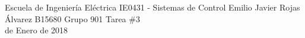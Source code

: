 \documentclass{ucrEieTarea}
\begin{document}
    {Escuela de Ingeniería Eléctrica}
    {IE0431 - Sistemas de Control}
    {Emilio Javier Rojas Álvarez}
    {B15680}
    {Grupo 901}
    {Tarea \#3\\{\footnotesize{} de Enero de 2018}}
  
  
  
\end{document}
